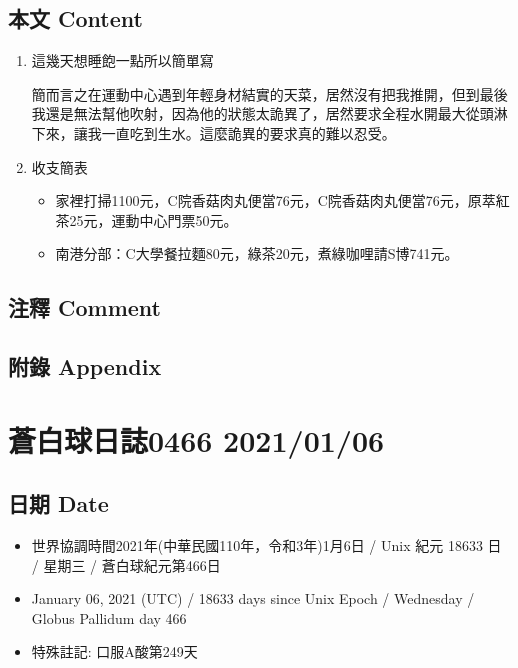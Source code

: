 \documentclass[
]{article}
\providecommand{\tightlist}{%
  \setlength{\itemsep}{0pt}\setlength{\parskip}{0pt}}
\begin{document}
\hypertarget{ux672cux6587-content-4}{%
\subsection{本文 Content}\label{ux672cux6587-content-4}}

\begin{enumerate}
\def\labelenumi{\arabic{enumi}.}
\item
  這幾天想睡飽一點所以簡單寫

  簡而言之在運動中心遇到年輕身材結實的天菜，居然沒有把我推開，但到最後我還是無法幫他吹射，因為他的狀態太詭異了，居然要求全程水開最大從頭淋下來，讓我一直吃到生水。這麼詭異的要求真的難以忍受。
\item
  收支簡表

  \begin{itemize}
  \tightlist
  \item
    家裡打掃1100元，C院香菇肉丸便當76元，C院香菇肉丸便當76元，原萃紅茶25元，運動中心門票50元。
  \item
    南港分部：C大學餐拉麵80元，綠茶20元，煮綠咖哩請S博741元。
  \end{itemize}
\end{enumerate}

\hypertarget{ux6ce8ux91cb-comment-4}{%
\subsection{注釋 Comment}\label{ux6ce8ux91cb-comment-4}}

\hypertarget{ux9644ux9304-appendix-4}{%
\subsection{附錄 Appendix}\label{ux9644ux9304-appendix-4}}

\hypertarget{ux84bcux767dux7403ux65e5ux8a8c0466-20210106}{%
\section{蒼白球日誌0466
2021/01/06}\label{ux84bcux767dux7403ux65e5ux8a8c0466-20210106}}

\hypertarget{ux65e5ux671f-date-5}{%
\subsection{日期 Date}\label{ux65e5ux671f-date-5}}

\begin{itemize}
\tightlist
\item
  世界協調時間2021年(中華民國110年，令和3年)1月6日 / Unix 紀元 18633 日
  / 星期三 / 蒼白球紀元第466日
\item
  January 06, 2021 (UTC) / 18633 days since Unix Epoch / Wednesday /
  Globus Pallidum day 466
\item
  特殊註記: 口服A酸第249天
\end{itemize}
\end{document}
